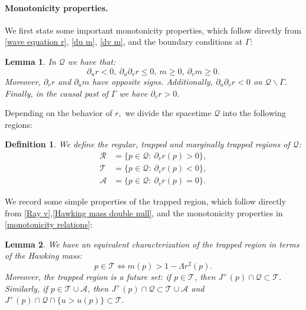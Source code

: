 \documentclass[11pt]{article}
\newtheorem{lemma}{Lemma}[section]
\newtheorem{definition}{Definition}[section]
\numberwithin{equation}{section}
\begin{document}
\paragraph{Monotonicity properties.}
We first state some important monotonicity properties, which follow directly from \eqref{wave equation r}, \eqref{du m}, \eqref{dv m}, and the boundary conditions at $\Gamma:$
\begin{lemma}\label{monotonicity lemma}
In $\mathcal{Q}$ we have that:
\begin{equation}\label{monotonicity relations}
    \partial_ur<0,\ \partial_u\partial_vr\leq0,\ m\geq0,\ \partial_vm\geq0.
\end{equation}
Moreover, $\partial_vr$ and $\partial_um$ have opposite signs. Additionally, $\partial_u\partial_vr<0$ on $\mathcal{Q}\backslash\Gamma$. Finally, in the causal past of $\Gamma$ we have $\partial_vr>0.$
\end{lemma}
Depending on the behavior of $r,$ we divide the spacetime $\mathcal{Q}$ into the following regions:
\begin{definition}
    We define the regular, trapped and marginally trapped regions of $\mathcal{Q}$:
    \begin{align*}
        \mathcal{R}&=\Big\{p\in\mathcal{Q}:\ \partial_vr(p)>0\Big\},\\
        \mathcal{T}&=\Big\{p\in\mathcal{Q}:\ \partial_vr(p)<0\Big\},\\
        \mathcal{A}&=\Big\{p\in\mathcal{Q}:\ \partial_vr(p)=0\Big\}.
    \end{align*}
\end{definition}
We record some simple properties of the trapped region, which follow directly from \eqref{Ray v},\eqref{Hawking mass double null}, and the monotonicity properties in \eqref{monotonicity relations}:
\begin{lemma}\label{trapped region lemma}
    We have an equivalent characterization of the trapped region in terms of the Hawking mass:
    \begin{equation}\label{trapped using mass}
        p\in\mathcal{T} \Longleftrightarrow m(p)>1-\Lambda r^2(p).
    \end{equation}
    Moreover, the trapped region is a future set: if $p\in\mathcal{T}$, then $J^+(p)\cap\mathcal{Q}\subset\mathcal{T}.$ Similarly, if $p\in\mathcal{T}\cup\mathcal{A}$, then $J^+(p)\cap\mathcal{Q}\subset\mathcal{T}\cup\mathcal{A}$ and $J^+(p)\cap\mathcal{Q}\cap\{u>u(p)\}\subset\mathcal{T}.$
\end{lemma}
\end{document}

